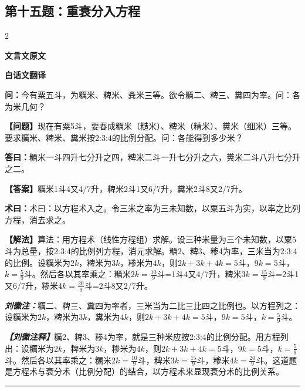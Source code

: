 \documentclass[10pt,a4paper]{article}
\newcommand{\wen}[1]{\textbf{\color{problemcolor}问：}#1\par}
\newcommand{\da}[1]{\textbf{答曰：}#1\par}
\newcommand{\shu}[1]{\textbf{术曰：}#1\par}
\newcommand{\liuhui}[1]{{\color{commentarycolor}\textit{\textbf{刘徽注：}}#1\par}}
\newcommand{\classicalheader}[1]{{\centering\large\bfseries\color{classicalcolor} #1\par\vspace{0.5em}}}
\newcommand{\wenmodern}[1]{\textbf{\color{moderncolor}【问题】}#1\par}
\newcommand{\damodern}[1]{\textbf{【答案】}#1\par}
\newcommand{\shumodern}[1]{\textbf{【解法】}#1\par}
\newcommand{\liuhuimodern}[1]{{\color{commentarycolor}\textit{\textbf{【刘徽注释】}}#1\par}}
\newcommand{\modernheader}[1]{{\centering\large\bfseries\color{moderncolor} #1\par\vspace{0.5em}}}
\newcommand{\problemsec}[1]{\subsection*{#1}}
\begin{document}
\problemsec{第十五题：重衰分入方程}
\begin{paracol}{2}
\classicalheader{文言文原文}
\switchcolumn
\modernheader{白话文翻译}
\switchcolumn*

\wen{今有粟五斗，为糲米、粺米、粪米三等。欲令糲二、粺三、糞四为率。问：各为米几何？}

\switchcolumn

\wenmodern{现在有粟5斗，要舂成糲米（糙米）、粺米（精米）、糞米（细米）三等。要求糲米、粺米、糞米按2:3:4的比例分配。问：各能得到多少米？}

\switchcolumn*

\da{糲米一斗四升七分升之四，粺米二斗一升七分升之六，糞米二斗八升七分升之二。}

\switchcolumn

\damodern{糲米1斗4又4/7升，粺米2斗1又6/7升，糞米2斗8又2/7升。}

\switchcolumn*

\shu{术曰：以方程术入之。令三米之率为三未知数，以粟五斗为实，以率之比列方程，消去求之。}

\switchcolumn

\shumodern{算法：用方程术（线性方程组）求解。设三种米量为三个未知数，以粟5斗为总量，按2:3:4的比例列方程，消元求解。糲2、粺3、糁4为率，三米当为2:3:4的比例。设糲米为$2k$，粺米为$3k$，糁米为$4k$，则$2k+3k+4k=5$斗，$9k=5$斗，$k=\frac{5}{9}$斗。然后各以其率乘之：糲米$2k=\frac{10}{9}$斗=1斗4又4/7升，粺米$3k=\frac{15}{9}$斗=2斗1又6/7升，糁米$4k=\frac{20}{9}$斗=2斗8又2/7升。}

\switchcolumn*

\liuhui{糲二、粺三、糞四为率者，三米当为二比三比四之比例也。以方程列之：设糲米为$2k$，粺米为$3k$，糞米为$4k$，则$2k + 3k + 4k = 5$斗，$9k = 5$斗，$k = \frac{5}{9}$斗。}

\switchcolumn

\liuhuimodern{糲2、粺3、糁4为率，就是三种米应按2:3:4的比例分配。用方程列出：设糲米为$2k$，粺米为$3k$，糁米为$4k$，则$2k+3k+4k=5$斗，$9k=5$斗，$k=\frac{5}{9}$斗。然后各以其率乘之：糲米$2k=\frac{10}{9}$斗，粺米$3k=\frac{15}{9}$斗，糁米$4k=\frac{20}{9}$斗。这道题是方程术与衰分术（比例分配）的结合，以方程术来显现衰分术的比例关系。}

\end{paracol}

\vspace{0.3cm}
\hrule
\vspace{0.3cm}
\end{document}
